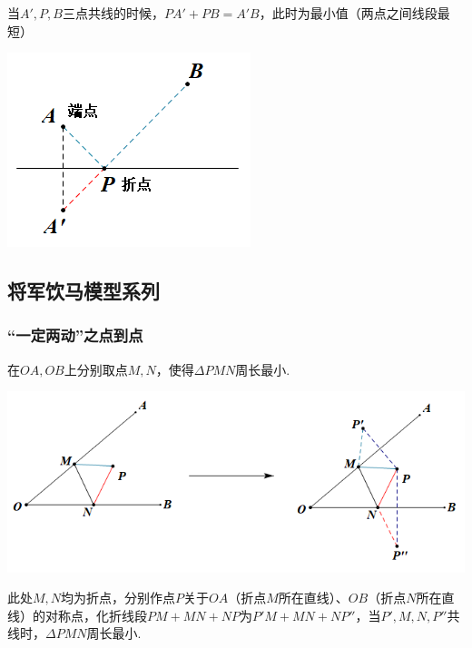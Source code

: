 当$A',P,B$三点共线的时候，$PA'+PB=A'B$，此时为最小值（两点之间线段最短）

\includegraphics[scale=0.6]{figure/1-4.PNG} 

\subsection{将军饮马模型系列}
\subsubsection{“一定两动”之点到点}
在$OA,OB$上分别取点$M,N$，使得$\Delta PMN$周长最小.

\includegraphics[scale=0.6]{figure/2-1.PNG}
 
此处$M,N$均为折点，分别作点$P$关于$OA$（折点$M$所在直线）、$OB$（折点$N$所在直线）的对称点，化折线段$PM+MN+NP$为$P'M+MN+NP''$，当$P',M,N,P''$共线时，$\Delta PMN$周长最小.


